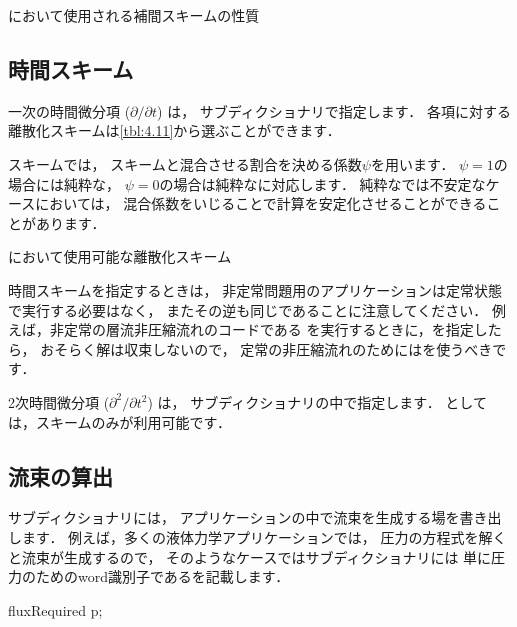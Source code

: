 \begin{table}[ht]
 
 \caption{において使用される補間スキームの性質}
 \label{tbl:4.10}
\end{table}


\subsection{時間スキーム}
\label{ssec:4.4.6}
一次の時間微分項 ($\partial /\partial t$) は，
サブディクショナリで指定します．
各項に対する離散化スキームは\autoref{tbl:4.11}から選ぶことができます．

スキームでは，
スキームと混合させる割合を決める係数$\psi$を用います．
$\psi = 1$の場合には純粋な，
$\psi = 0$の場合は純粋なに対応します．
純粋なでは不安定なケースにおいては，
混合係数をいじることで計算を安定化させることができることがあります．


\begin{table}[ht]
 
 \caption{において使用可能な離散化スキーム}
 \label{tbl:4.11}
\end{table}


時間スキームを指定するときは，
非定常問題用のアプリケーションは定常状態で実行する必要はなく，
またその逆も同じであることに注意してください．
例えば，非定常の層流非圧縮流れのコードである
を実行するときに，を指定したら，
おそらく解は収束しないので，
定常の非圧縮流れのためにはを使うべきです．

2次時間微分項 ($\partial^{2}/\partial t^{2}$) は，
サブディクショナリの中で指定します．
としては，スキームのみが利用可能です．


\subsection{流束の算出}
\label{ssec:4.4.7}
サブディクショナリには，
アプリケーションの中で流束を生成する場を書き出します．
例えば，多くの液体力学アプリケーションでは，
圧力の方程式を解くと流束が生成するので，
そのようなケースではサブディクショナリには
単に圧力のためのword識別子であるを記載します．
\begin{OFverbatim}[file]
fluxRequired
{
    p;
}
\end{OFverbatim}



